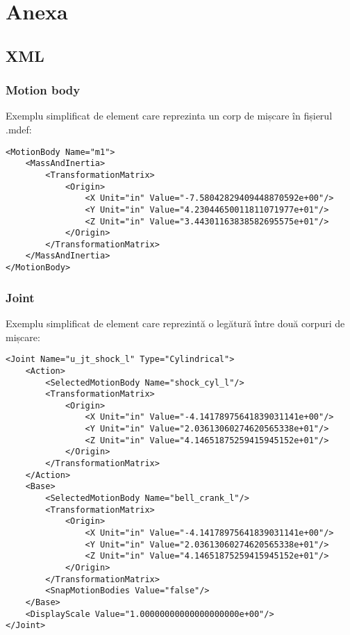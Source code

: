 \newpage
\section{Anexa}

\subsection{XML}
\subsubsection{Motion body}
Exemplu simplificat de element care reprezinta un corp de mișcare în fișierul .mdef:
\lstset{language=XML}
\begin{lstlisting}
<MotionBody Name="m1">
    <MassAndInertia>
        <TransformationMatrix>
            <Origin>
                <X Unit="in" Value="-7.58042829409448870592e+00"/>
                <Y Unit="in" Value="4.23044650011811071977e+01"/>
                <Z Unit="in" Value="3.44301163838582695575e+01"/>
            </Origin>
        </TransformationMatrix>
    </MassAndInertia>
</MotionBody>

\end{lstlisting}

\subsubsection{Joint}
Exemplu simplificat de element care reprezintă o legătură între două corpuri de mișcare:

\lstset{language=XML}
\begin{lstlisting}
<Joint Name="u_jt_shock_l" Type="Cylindrical">
    <Action>
        <SelectedMotionBody Name="shock_cyl_l"/>
        <TransformationMatrix>
            <Origin>
                <X Unit="in" Value="-4.14178975641839031141e+00"/>
                <Y Unit="in" Value="2.03613060274620565338e+01"/>
                <Z Unit="in" Value="4.14651875259415945152e+01"/>
            </Origin>
        </TransformationMatrix>
    </Action>
    <Base>
        <SelectedMotionBody Name="bell_crank_l"/>
        <TransformationMatrix>
            <Origin>
                <X Unit="in" Value="-4.14178975641839031141e+00"/>
                <Y Unit="in" Value="2.03613060274620565338e+01"/>
                <Z Unit="in" Value="4.14651875259415945152e+01"/>
            </Origin>
        </TransformationMatrix>
        <SnapMotionBodies Value="false"/>
    </Base>
    <DisplayScale Value="1.00000000000000000000e+00"/>
</Joint>
\end{lstlisting}

